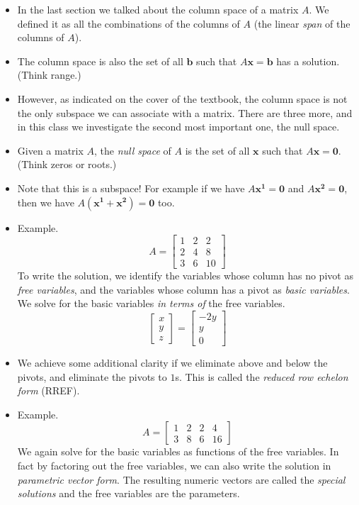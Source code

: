 \documentclass[11pt,oneside]{amsbook}
\theoremstyle{definition}
\theoremstyle{plain}
\theoremstyle{definition}
\theoremstyle{remark}
\numberwithin{equation}{section}
\numberwithin{figure}{section}
\begin{document}
\begin{itemize}
\item In the last section we talked about the column space of a matrix $A$. We defined it as all the combinations of the columns of $A$ (the linear \emph{span} of the columns of $A$).
\item The column space is also the set of all $\mathbf{b}$ such that $A\mathbf{x}=\mathbf{b}$ has a solution. (Think range.)
\item However, as indicated on the cover of the textbook, the column space is not the only subspace we can associate with a matrix. There are three more, and in this class we investigate the second most important one, the null space.
\item Given a matrix $A$, the \emph{null space} of $A$ is the set of all $\mathbf{x}$ such that $A\mathbf{x}=\mathbf{0}$. (Think zeros or roots.)
\item Note that this is a subspace! For example if we have $A\mathbf{x^1}=\mathbf{0}$ and $A\mathbf{x^2}=\mathbf{0}$, then we have $A(\mathbf{x^1}+\mathbf{x^2})=\mathbf{0}$ too.
\item Example.
  \[A=\begin{bmatrix}
      1&2&2\\2&4&8\\3&6&10
    \end{bmatrix}
  \]
  To write the solution, we identify the variables whose column has no pivot as \emph{free variables}, and the variables whose column has a pivot as \emph{basic variables}. We solve for the basic variables \emph{in terms of} the free variables.
  \[\begin{bmatrix}x\\y\\z\end{bmatrix}
    =\begin{bmatrix}-2y\\y\\0\end{bmatrix}
  \]
\item We achieve some additional clarity if we eliminate above and below the pivots, and eliminate the pivots to $1$s. This is called the \emph{reduced row echelon form} (RREF).
\item Example.
  \[A=\begin{bmatrix}
      1&2&2&4\\3&8&6&16
    \end{bmatrix}
  \]
  We again solve for the basic variables as functions of the free variables. In fact by factoring out the free variables, we can also write the solution in \emph{parametric vector form}. The resulting numeric vectors are called the \emph{special solutions} and the free variables are the parameters.
  

\end{itemize}
\end{document}
